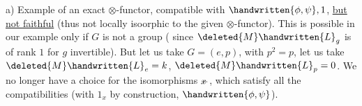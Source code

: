 a) Example of an exact $\otimes$-functor, compatible with $\handwritten{\phi,\psi},1$, \uline{but not faithful} (thus not locally isoorphic to the given $\otimes$-functor). This is possible in our example only if $G$ is not a group ( since $\deleted{M}\handwritten{L}_g$ is of rank $1$ for $g$ invertible). But let us take $G=(e,p)$, with $p^2=p$, let us take $\deleted{M}\handwritten{L}_e=k$, $\deleted{M}\handwritten{L}_p=0$. We no longer have a choice for the isomorphisms $\rlap{\(x\)}-$, which satisfy all the compatibilities (with $1_x$ by construction, $\handwritten{\phi,\psi}$).
